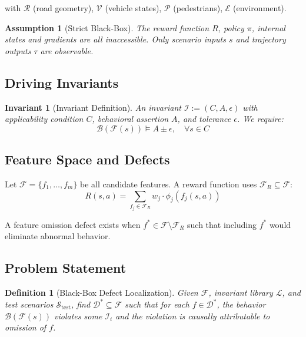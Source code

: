 \documentclass[conference]{IEEEtran}
\theoremstyle{plain}
\newtheorem{assumption}{Assumption}[section]
\newtheorem{invariant}{Invariant}[section]
\newtheorem{definition}{Definition}[section]
\newcommand{\invlib}{\mathcal{L}}
\newcommand{\sys}{\mathcal{F}}
\newcommand{\beh}{\mathcal{B}}
\begin{document}
\noindent with $\mathcal{R}$ (road geometry), $\mathcal{V}$ (vehicle states), $\mathcal{P}$ (pedestrians), $\mathcal{E}$ (environment).

\begin{assumption}[Strict Black-Box]\label{assump:box}
The reward function $R$, policy $\pi$, internal states and gradients are all inaccessible. Only scenario inputs $s$ and trajectory outputs $\tau$ are observable.
\end{assumption}

\subsection{Driving Invariants}
\begin{invariant}[Invariant Definition]\label{inv:def}
An invariant $\mathcal{I} := (C, A, \epsilon)$ with applicability condition $C$, behavioral assertion $A$, and tolerance $\epsilon$. We require:
\begin{equation}
\beh(\sys(s)) \models A \pm \epsilon, \quad \forall s \in C
\label{eq:invariant}
\end{equation}
\end{invariant}

\subsection{Feature Space and Defects}
Let $\mathcal{F} = \{f_1,\dots,f_m\}$ be all candidate features. A reward function uses $\mathcal{F}_R \subseteq \mathcal{F}$:
\begin{equation}
R(s,a) = \sum_{f_j \in \mathcal{F}_R} w_j \cdot \phi_j(f_j(s,a))
\label{eq:reward}
\end{equation}

\noindent A feature omission defect exists when $f^* \in \mathcal{F}\setminus\mathcal{F}_R$ such that including $f^*$ would eliminate abnormal behavior.

\subsection{Problem Statement}
\begin{definition}[Black-Box Defect Localization]\label{def:problem}
Given $\sys$, invariant library $\invlib$, and test scenarios $\mathcal{S}_{\text{test}}$, find $\mathcal{D}^* \subseteq \mathcal{F}$ such that for each $f \in \mathcal{D}^*$, the behavior $\beh(\sys(s))$ violates some $\mathcal{I}_i$ and the violation is causally attributable to omission of $f$.
\end{definition}
\end{document}

